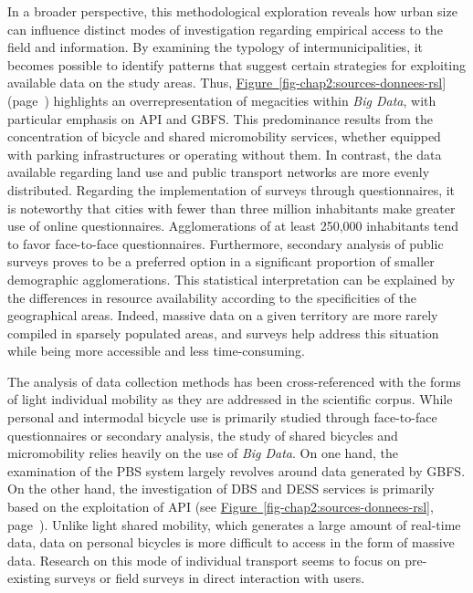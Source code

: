 \begin{refsegment}
In a broader perspective, this methodological exploration reveals how urban size can influence distinct modes of investigation regarding empirical access to the field and information. By examining the typology of intermunicipalities, it becomes possible to identify patterns that suggest certain strategies for exploiting available data on the study areas. Thus, \hyperref[fig-chap2:sources-donnees-rsl]{Figure~\ref{fig-chap2:sources-donnees-rsl}} (page~\pageref{fig-chap2:sources-donnees-rsl}) highlights an overrepresentation of megacities within \textsl{Big Data}, with particular emphasis on \acrshort{API} and \acrshort{GBFS}. This predominance results from the concentration of bicycle and shared micromobility services, whether equipped with parking infrastructures or operating without them. In contrast, the data available regarding land use and public transport networks are more evenly distributed. Regarding the implementation of surveys through questionnaires, it is noteworthy that cities with fewer than three million inhabitants make greater use of online questionnaires. Agglomerations of at least 250,000 inhabitants tend to favor face-to-face questionnaires. Furthermore, secondary analysis of public surveys proves to be a preferred option in a significant proportion of smaller demographic agglomerations. This statistical interpretation can be explained by the differences in resource availability according to the specificities of the geographical areas. Indeed, massive data on a given territory are more rarely compiled in sparsely populated areas, and surveys help address this situation while being more accessible and less time-consuming.%

The analysis of data collection methods has been cross-referenced with the forms of light individual mobility as they are addressed in the scientific corpus. While personal and intermodal bicycle use is primarily studied through face-to-face questionnaires or secondary analysis, the study of shared bicycles and micromobility relies heavily on the use of \textsl{Big Data}. On one hand, the examination of the \acrshort{PBS} system largely revolves around data generated by \acrshort{GBFS}. On the other hand, the investigation of \acrshort{DBS} and \acrshort{DESS} services is primarily based on the exploitation of \acrshort{API} (see \hyperref[fig-chap2:sources-donnees-rsl]{Figure~\ref{fig-chap2:sources-donnees-rsl}}, page~\pageref{fig-chap2:sources-donnees-rsl}). Unlike light shared mobility, which generates a large amount of real-time data, data on personal bicycles is more difficult to access in the form of massive data. Research on this mode of individual transport seems to focus on pre-existing surveys or field surveys in direct interaction with users.%


\end{refsegment}
